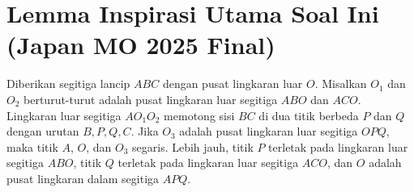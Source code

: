 \newpage
\section{Lemma Inspirasi Utama Soal Ini (Japan MO 2025 Final)}
\begin{lemma*}
    Diberikan segitiga lancip $ABC$ dengan pusat lingkaran luar $O$. Misalkan $O_1$ dan $O_2$ berturut-turut adalah pusat lingkaran luar segitiga $ABO$ dan $ACO$. Lingkaran luar segitiga $AO_1O_2$ memotong sisi $BC$ di dua titik berbeda $P$ dan $Q$ dengan urutan $B, P, Q, C$. Jika $O_3$ adalah pusat lingkaran luar segitiga $OPQ$, maka titik $A$, $O$, dan $O_3$ segaris. Lebih jauh, titik $P$ terletak pada lingkaran luar segitiga $ABO$, titik $Q$ terletak pada lingkaran luar segitiga $ACO$, dan $O$ adalah pusat lingkaran dalam segitiga $APQ$.
\end{lemma*}



